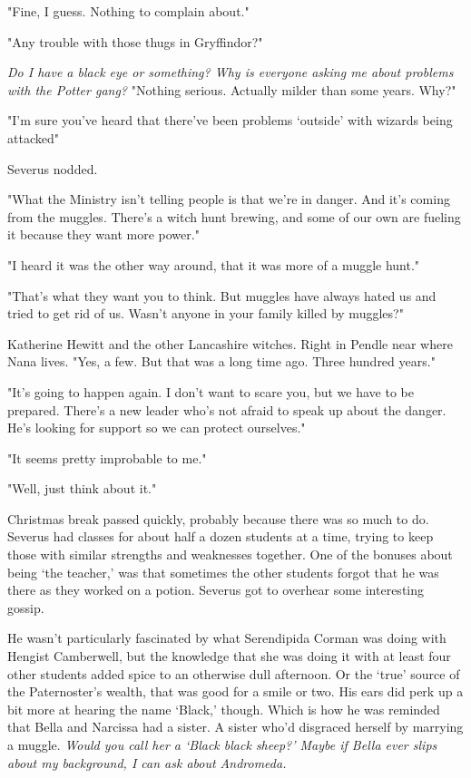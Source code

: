 "Fine, I guess. Nothing to complain about."

"Any trouble with those thugs in Gryffindor?"

\emph{Do I have a black eye or something? Why is everyone asking me about problems with the Potter gang?} "Nothing serious. Actually milder than some years. Why?"

"I'm sure you've heard that there've been problems `outside' with wizards being attacked{\el}"

Severus nodded.

"What the Ministry isn't telling people is that we're in danger. And it's coming from the muggles. There's a witch hunt brewing, and some of our own are fueling it because they want more power."

"I heard it was the other way around, that it was more of a muggle hunt."

"That's what they want you to think. But muggles have always hated us and tried to get rid of us. Wasn't anyone in your family killed by muggles?"

Katherine Hewitt and the other Lancashire witches. Right in Pendle near where Nana lives. "Yes, a few. But that was a long time ago. Three hundred years."

"It's going to happen again. I don't want to scare you, but we have to be prepared. There's a new leader who's not afraid to speak up about the danger. He's looking for support so we can protect ourselves."

"It seems pretty improbable to me."

"Well, just think about it."

Christmas break passed quickly, probably because there was so much to do. Severus had classes for about half a dozen students at a time, trying to keep those with similar strengths and weaknesses together. One of the bonuses about being `the teacher,' was that sometimes the other students forgot that he was there as they worked on a potion. Severus got to overhear some interesting gossip.

He wasn't particularly fascinated by what Serendipida Corman was doing with Hengist Camberwell, but the knowledge that she was doing it with at least four other students added spice to an otherwise dull afternoon. Or the `true' source of the Paternoster's wealth, that was good for a smile or two. His ears did perk up a bit more at hearing the name `Black,' though. Which is how he was reminded that Bella and Narcissa had a sister. A sister who'd disgraced herself by marrying a muggle. \emph{Would you call her a `Black black sheep?' Maybe if Bella ever slips about my background, I can ask about Andromeda.}

